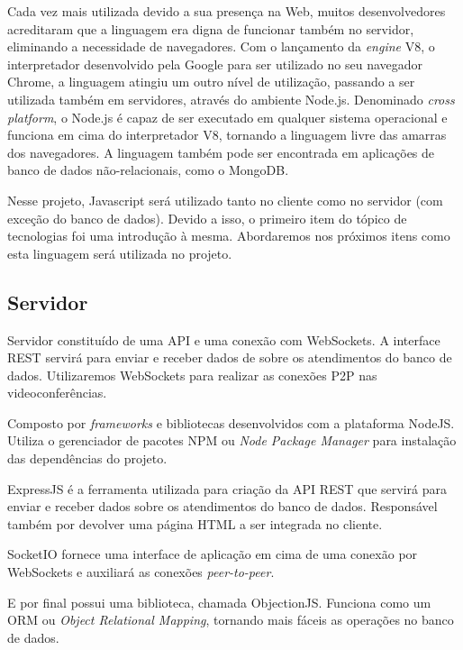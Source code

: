 Cada vez mais utilizada devido a sua presença na Web, muitos desenvolvedores acreditaram que a linguagem era digna de funcionar também no servidor, eliminando a necessidade de navegadores. Com o lançamento da \textit{engine} V8, o interpretador desenvolvido pela Google para ser utilizado no seu navegador Chrome, a linguagem atingiu um outro nível de utilização, passando a ser utilizada também em servidores, através do ambiente Node.js. Denominado \textit{cross platform}, o Node.js é capaz de ser executado em qualquer sistema operacional e funciona em cima do interpretador V8, tornando a linguagem livre das amarras dos navegadores. A linguagem também pode ser encontrada em aplicações de banco de dados não-relacionais, como o MongoDB.

Nesse projeto, Javascript será utilizado tanto no cliente como no servidor (com exceção do banco de dados). Devido a isso, o primeiro item do tópico de tecnologias foi uma introdução à mesma. Abordaremos nos próximos itens como esta linguagem será utilizada no projeto.

\subsection{Servidor}

Servidor constituído de uma API e uma conexão com WebSockets. A interface REST servirá para enviar e receber dados de sobre os atendimentos do banco de dados. Utilizaremos WebSockets para realizar as conexões P2P nas videoconferências.

Composto por \textit{frameworks} e bibliotecas desenvolvidos com a plataforma NodeJS. Utiliza o gerenciador de pacotes NPM ou \textit{Node Package Manager} para instalação das dependências do projeto.

ExpressJS é a ferramenta utilizada para criação da API REST que servirá para enviar e receber dados sobre os atendimentos do banco de dados. Responsável também por devolver uma página HTML a ser integrada no cliente.

SocketIO fornece uma interface de aplicação em cima de uma conexão por WebSockets e auxiliará as conexões \textit{peer-to-peer}.

E por final possui uma biblioteca, chamada ObjectionJS. Funciona como um ORM ou \textit{Object Relational Mapping}, tornando mais fáceis as operações no banco de dados.

